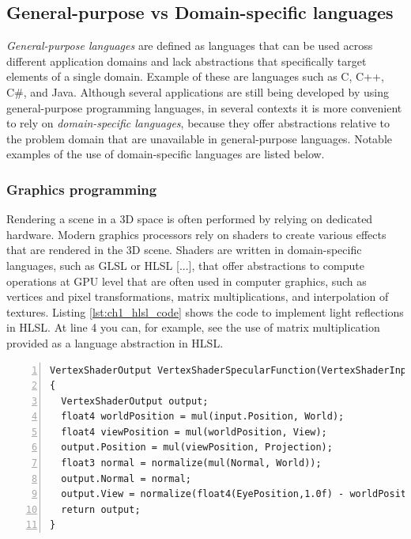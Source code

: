 \subsection{General-purpose vs Domain-specific languages}
\label{sec:ch1_dsl}
\textit{General-purpose languages} are defined as languages that can be used across different application domains and lack abstractions that specifically target elements of a single domain. Example of these are languages such as C, C++, C\#, and Java. Although several applications are still being developed by using general-purpose programming languages, in several contexts it is more convenient to rely on \textit{domain-specific languages}, because they offer abstractions relative to the problem domain that are unavailable in general-purpose languages. Notable examples of the use of domain-specific languages are listed below.

\subsubsection*{Graphics programming}
Rendering a scene in a 3D space is often performed by relying on dedicated hardware. Modern graphics processors rely on shaders to create various effects that are rendered in the 3D scene. Shaders are written in domain-specific languages, such as GLSL or HLSL [...], that offer abstractions to compute operations at GPU level that are often used in computer graphics, such as vertices and pixel transformations, matrix multiplications, and interpolation of textures. Listing \ref{lst:ch1_hlsl_code} shows the code to implement light reflections in HLSL. At line 4 you can, for example, see the use of matrix multiplication provided as a language abstraction in HLSL.

\begin{lstlisting}[numbers = left, caption = HLSL code to compute the light reflection, label = lst:ch1_hlsl_code]
VertexShaderOutput VertexShaderSpecularFunction(VertexShaderInput input, float3 Normal : NORMAL)
{
  VertexShaderOutput output;
  float4 worldPosition = mul(input.Position, World);
  float4 viewPosition = mul(worldPosition, View);
  output.Position = mul(viewPosition, Projection);
  float3 normal = normalize(mul(Normal, World));
  output.Normal = normal;
  output.View = normalize(float4(EyePosition,1.0f) - worldPosition);
  return output;
}
\end{lstlisting}

